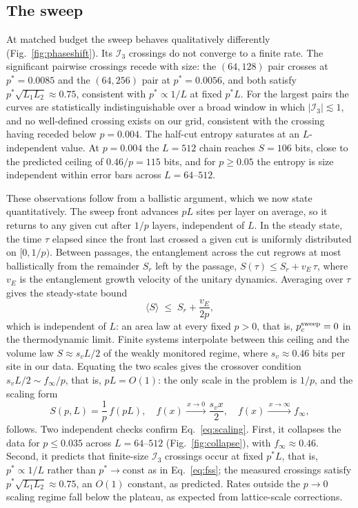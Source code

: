 \documentclass[aps,prb,twocolumn,superscriptaddress,nofootinbib]{revtex4-2}
\newcommand{\I}{\mathcal{I}}
\begin{document}
\subsection{The sweep}
At matched budget the sweep behaves qualitatively differently
(Fig.~\ref{fig:phaseshift}). Its $\I_3$ crossings do not converge to a
finite rate. The significant pairwise crossings recede with size: the
$(64,128)$ pair crosses at $p^\ast = 0.0085$ and the $(64,256)$ pair at
$p^\ast = 0.0056$, and both satisfy $p^\ast \sqrt{L_1 L_2} \approx 0.75$,
consistent with $p^\ast \propto 1/L$ at fixed $p^\ast L$. For the largest
pairs the curves are statistically indistinguishable over a broad window
in which $|\I_3| \lesssim 1$, and no well-defined crossing exists on our
grid, consistent with the crossing having receded below $p = 0.004$. The
half-cut entropy saturates at an $L$-independent value. At $p = 0.004$ the
$L = 512$ chain reaches $S = 106$ bits, close to the predicted ceiling of
$0.46/p = 115$ bits, and for $p \ge 0.05$ the entropy is size independent
within error bars across $L = 64$--$512$.

These observations follow from a ballistic argument, which we now state
quantitatively. The sweep front advances $pL$ sites per layer on
average, so it returns to any given cut after $1/p$ layers, independent
of $L$. In the steady state, the time $\tau$ elapsed since the front
last crossed a given cut is uniformly distributed on $[0, 1/p)$. Between
passages, the entanglement across the cut regrows at most ballistically
from the remainder $S_r$ left by the passage,
$S(\tau) \le S_r + v_E\,\tau$, where $v_E$ is the entanglement growth
velocity of the unitary dynamics. Averaging over $\tau$ gives the
steady-state bound
\begin{equation}
\langle S \rangle \;\le\; S_r + \frac{v_E}{2p},
\label{eq:ceiling}
\end{equation}
which is independent of $L$: an area law at every fixed $p > 0$, that
is, $p_c^{\rm sweep} = 0$ in the thermodynamic limit. Finite systems
interpolate between this ceiling and the volume law
$S \approx s_v L/2$ of the weakly monitored regime, where
$s_v \approx 0.46$ bits per site in our data. Equating the two scales
gives the crossover condition $s_v L/2 \sim f_\infty/p$, that is,
$pL = O(1)$: the only scale in the problem is $1/p$, and the scaling
form
\begin{equation}
S(p, L) = \frac{1}{p}\, f(pL),
\quad
f(x) \xrightarrow{\,x \to 0\,} \frac{s_v x}{2},
\quad
f(x) \xrightarrow{\,x \to \infty\,} f_\infty,
\label{eq:scaling}
\end{equation}
follows. Two independent checks confirm Eq.~\eqref{eq:scaling}. First,
it collapses the data for $p \le 0.035$ across $L = 64$--$512$
(Fig.~\ref{fig:collapse}), with $f_\infty \approx 0.46$. Second, it
predicts that finite-size $\I_3$ crossings occur at fixed $p^\ast L$,
that is, $p^\ast \propto 1/L$ rather than $p^\ast \to \mathrm{const}$ as
in Eq.~\eqref{eq:fss}; the measured crossings satisfy
$p^\ast \sqrt{L_1 L_2} \approx 0.75$, an $O(1)$ constant, as predicted.
Rates outside the $p \to 0$ scaling regime fall below the plateau, as
expected from lattice-scale corrections.
\end{document}
